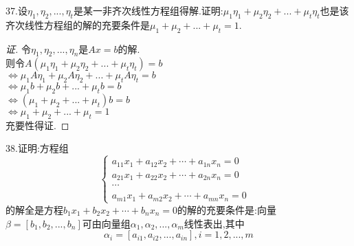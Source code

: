 \documentclass[10pt,a4paper]{report}
\begin{document}
\noindent 37.设$\eta_{1},\eta_{2},...,\eta_{t}$是某一非齐次线性方程组得解.证明:$\mu_{1}\eta_{1}+\mu_{2}\eta_{2}+...+\mu_{t}\eta_{t}$也是该齐次线性方程组的解的充要条件是$\mu_{1}+\mu_{2}+...+\mu_{t}=1$.
\begin{proof}[证]
	令$\eta_{1},\eta_{2},...,\eta_{n}$是$Ax=b$的解.\\
	则令$A(\mu_{1}\eta_{1}+\mu_{2}\eta_{2}+...+\mu_{t}\eta_{t})=b$\\
	$\Leftrightarrow \mu_{1}A\eta_{1}+\mu_{2}A\eta_{2}+...+\mu_{t}A\eta_{t}=b$\\
	$\Leftrightarrow \mu_{1}b+\mu_{2}b+...+\mu_{t}b=b$\\
	$\Leftrightarrow (\mu_{1}+\mu_{2}+...+\mu_{t})b=b$\\
	$\Leftrightarrow \mu_{1}+\mu_{2}+...+\mu_{t} = 1$ \\
	充要性得证.
\end{proof}
\noindent 38.证明:方程组
$$
\left\{
\begin{aligned}
a_{11}x_{1}+a_{12}x_{2}+\cdots+a_{1n}x_{n}=0 \\
a_{21}x_{1}+a_{22}x_{2}+\cdots+a_{2n}x_{n}=0 \\
\cdots & \\
a_{m1}x_{1}+a_{m2}x_{2}+\cdots+a_{mn}x_{n}=0 
\end{aligned}
\right.
$$
的解全是方程$b_{1}x_{1}+b_{2}x_{2}+\cdots+b_{n}x_{n}=0$的解的充要条件是:向量$\beta = [b_{1}, b_{2}, ..., b_{n}]$可由向量组$\alpha_{1}, \alpha_{2},...,\alpha_{m}$线性表出,其中
$$
\alpha_{i}=[a_{i1}, a_{i2},...,a_{in}], i=1,2,...,m
$$
\end{document}

